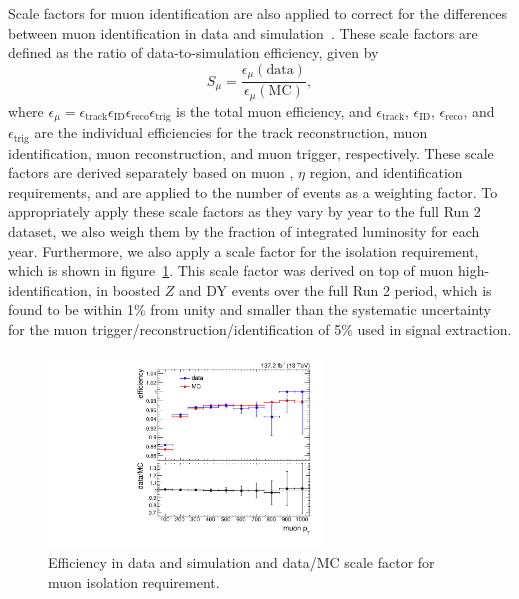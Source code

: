 Scale factors for muon identification are also applied to correct for the differences between muon identification in data and simulation~\cite{Sirunyan_2020}.
These scale factors are defined as the ratio of data-to-simulation efficiency, given by
\begin{equation}
  S_\mu=\frac{\epsilon_\mu(\mathrm{data})}{\epsilon_\mu(\mathrm{MC})},
\end{equation}
where $\epsilon_\mu=\epsilon_\mathrm{track}\epsilon_\mathrm{ID}\epsilon_\mathrm{reco}\epsilon_\mathrm{trig}$ is the total muon efficiency, and $\epsilon_\mathrm{track}$, $\epsilon_\mathrm{ID}$, $\epsilon_\mathrm{reco}$, and $\epsilon_\mathrm{trig}$ are the individual efficiencies for the track reconstruction, muon identification, muon reconstruction, and muon trigger, respectively.
These scale factors are derived separately based on muon \pt, $\eta$ region, and identification requirements, and are applied to the number of events as a weighting factor.
To appropriately apply these scale factors as they vary by year to the full Run 2 dataset, we also weigh them by the fraction of integrated luminosity for each year.
Furthermore, we also apply a scale factor for the isolation requirement, which is shown in figure~\ref{fig:muonIsoSF}.
This scale factor was derived on top of muon high-\pt identification, in boosted $Z$ and DY events over the full Run 2 period, which is found to be within 1\% from unity and smaller than the systematic uncertainty for the muon trigger/reconstruction/identification of 5\% used in signal extraction.

\begin{figure}[htbp]
  \centering
  \includegraphics[width=0.65\textwidth]{fig/eventSelection/muonFullIsoSF.pdf}
  \caption{
    Efficiency in data and simulation and data/MC scale factor for muon isolation requirement.
  }
  \label{fig:muonIsoSF}
\end{figure}

